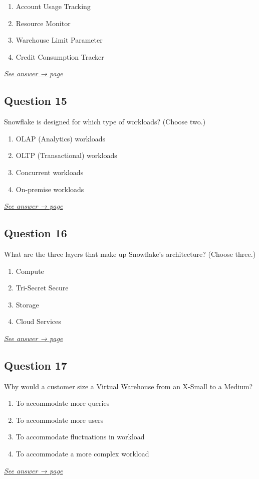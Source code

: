 \documentclass[12pt]{article}
\newcommand{\seeanswer}[1]{%
  \par\smallskip\emph{\hyperref[ans:#1]{See answer → page \pageref{ans:#1}}}%
}
\begin{document}
\begin{enumerate}[label=\Alph*.]
  \item Account Usage Tracking
  \item Resource Monitor
  \item Warehouse Limit Parameter
  \item Credit Consumption Tracker
\end{enumerate}
\seeanswer{14}

\subsection*{Question 15}\label{q:15}
Snowflake is designed for which type of workloads? (Choose two.)

\begin{enumerate}[label=\Alph*.]
  \item OLAP (Analytics) workloads
  \item OLTP (Transactional) workloads
  \item Concurrent workloads
  \item On-premise workloads
\end{enumerate}
\seeanswer{15}

\subsection*{Question 16}\label{q:16}
What are the three layers that make up Snowflake's architecture? (Choose three.)

\begin{enumerate}[label=\Alph*.]
  \item Compute
  \item Tri-Secret Secure
  \item Storage
  \item Cloud Services
\end{enumerate}
\seeanswer{16}

\subsection*{Question 17}\label{q:17}
Why would a customer size a Virtual Warehouse from an X-Small to a Medium?

\begin{enumerate}[label=\Alph*.]
  \item To accommodate more queries
  \item To accommodate more users
  \item To accommodate fluctuations in workload
  \item To accommodate a more complex workload
\end{enumerate}
\seeanswer{17}
\end{document}
